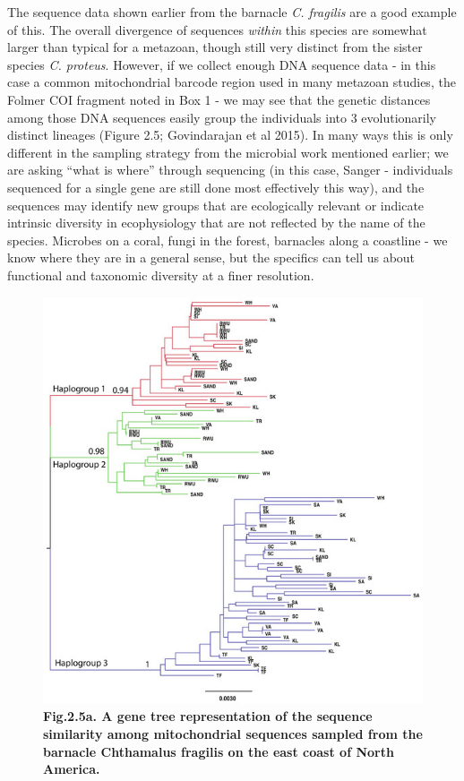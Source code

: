 \documentclass[
]{article}
\begin{document}
The sequence data shown earlier from the barnacle \emph{C. fragilis} are
a good example of this. The overall divergence of sequences
\emph{within} this species are somewhat larger than typical for a
metazoan, though still very distinct from the sister species \emph{C.
proteus}. However, if we collect enough DNA sequence data - in this case
a common mitochondrial barcode region used in many metazoan studies, the
Folmer COI fragment noted in Box 1 - we may see that the genetic
distances among those DNA sequences easily group the individuals into 3
evolutionarily distinct lineages (Figure 2.5; Govindarajan et al 2015).
In many ways this is only different in the sampling strategy from the
microbial work mentioned earlier; we are asking ``what is where''
through sequencing (in this case, Sanger - individuals sequenced for a
single gene are still done most effectively this way), and the sequences
may identify new groups that are ecologically relevant or indicate
intrinsic diversity in ecophysiology that are not reflected by the name
of the species. Microbes on a coral, fungi in the forest, barnacles
along a coastline - we know where they are in a general sense, but the
specifics can tell us about functional and taxonomic diversity at a
finer resolution.

\begin{figure}
\centering
\includegraphics{MEImages/fig-1-1x-2.jpg}
\caption{\textbf{Fig.2.5a. A gene tree representation of the sequence
similarity among mitochondrial sequences sampled from the barnacle
Chthamalus fragilis on the east coast of North America.}}
\end{figure}
\end{document}
